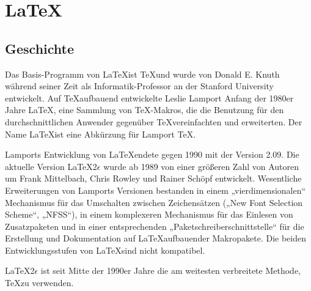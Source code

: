 \chapter{\LaTeX}
\section{Geschichte}

Das Basis-Programm von \LaTeX ist \TeX und wurde von Donald E. Knuth während seiner Zeit als Informatik-Professor an der Stanford University entwickelt. Auf \TeX aufbauend entwickelte Leslie Lamport Anfang der 1980er Jahre\cite{Lamport} \LaTeX, eine Sammlung von TeX-Makros, die die Benutzung für den durchschnittlichen Anwender gegenüber \TeX vereinfachten und erweiterten. Der Name \LaTeX ist eine Abkürzung für Lamport \TeX.

Lamports Entwicklung von \LaTeX endete gegen 1990 mit der Version 2.09.\cite{readme} Die aktuelle Version \LaTeX 2$\epsilon$ wurde ab 1989 von einer größeren Zahl von Autoren um Frank Mittelbach, Chris Rowley und Rainer Schöpf entwickelt.\cite{Mittelbach2010} Wesentliche Erweiterungen von Lamports Versionen bestanden in einem „vierdimensionalen“ Mechanismus für das Umschalten zwischen Zeichensätzen („New Font Selection Scheme“, „NFSS“), in einem komplexeren Mechanismus für das Einlesen von Zusatzpaketen und in einer entsprechenden „Paketschreiberschnittstelle“ für die Erstellung und Dokumentation auf \LaTeX aufbauender Makropakete.\cite{usrguide} Die beiden Entwicklungsstufen von \LaTeX sind nicht kompatibel.

\LaTeX 2$\epsilon$ ist seit Mitte der 1990er Jahre die am weitesten verbreitete Methode, \TeX zu verwenden.